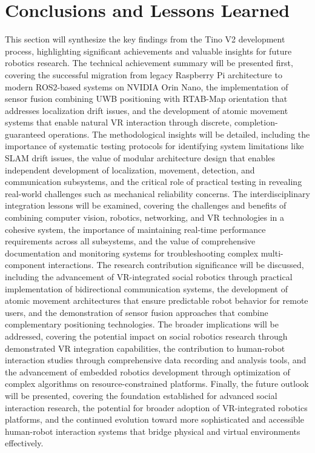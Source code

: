 \section{Conclusions and Lessons Learned}
This section will synthesize the key findings from the Tino V2 development process, highlighting significant achievements and valuable insights for future robotics research. The technical achievement summary will be presented first, covering the successful migration from legacy Raspberry Pi architecture to modern ROS2-based systems on NVIDIA Orin Nano, the implementation of sensor fusion combining UWB positioning with RTAB-Map orientation that addresses localization drift issues, and the development of atomic movement systems that enable natural VR interaction through discrete, completion-guaranteed operations. The methodological insights will be detailed, including the importance of systematic testing protocols for identifying system limitations like SLAM drift issues, the value of modular architecture design that enables independent development of localization, movement, detection, and communication subsystems, and the critical role of practical testing in revealing real-world challenges such as mechanical reliability concerns. The interdisciplinary integration lessons will be examined, covering the challenges and benefits of combining computer vision, robotics, networking, and VR technologies in a cohesive system, the importance of maintaining real-time performance requirements across all subsystems, and the value of comprehensive documentation and monitoring systems for troubleshooting complex multi-component interactions. The research contribution significance will be discussed, including the advancement of VR-integrated social robotics through practical implementation of bidirectional communication systems, the development of atomic movement architectures that ensure predictable robot behavior for remote users, and the demonstration of sensor fusion approaches that combine complementary positioning technologies. The broader implications will be addressed, covering the potential impact on social robotics research through demonstrated VR integration capabilities, the contribution to human-robot interaction studies through comprehensive data recording and analysis tools, and the advancement of embedded robotics development through optimization of complex algorithms on resource-constrained platforms. Finally, the future outlook will be presented, covering the foundation established for advanced social interaction research, the potential for broader adoption of VR-integrated robotics platforms, and the continued evolution toward more sophisticated and accessible human-robot interaction systems that bridge physical and virtual environments effectively.
